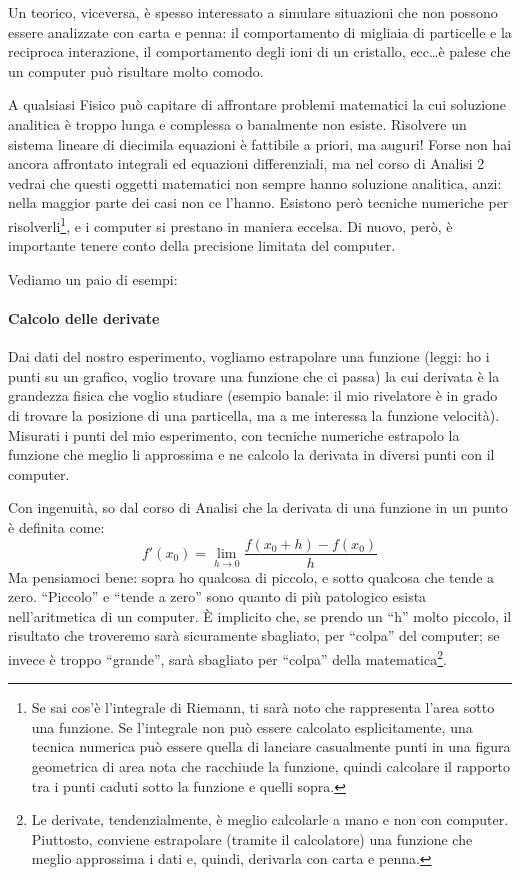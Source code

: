 	Un teorico, viceversa, è spesso interessato a simulare situazioni che non possono essere analizzate con carta e penna: il comportamento di migliaia di particelle e la reciproca interazione, il comportamento degli ioni di un cristallo, ecc\ldots è palese che un computer può risultare molto comodo. 
	
	A qualsiasi Fisico può capitare di affrontare problemi matematici la cui soluzione analitica è troppo lunga e complessa o banalmente non esiste. Risolvere un sistema lineare di diecimila equazioni è fattibile a priori, ma auguri! Forse non hai ancora affrontato integrali ed equazioni differenziali, ma nel corso di Analisi 2 vedrai che questi oggetti matematici non sempre hanno soluzione analitica, anzi: nella maggior parte dei casi non ce l'hanno. Esistono però tecniche numeriche per risolverli\footnote{Se sai cos'è l'integrale di Riemann, ti sarà noto che rappresenta l'area sotto una funzione. Se l'integrale non può essere calcolato esplicitamente, una tecnica numerica può essere quella di lanciare casualmente punti in una figura geometrica di area nota che racchiude la funzione, quindi calcolare il rapporto tra i punti caduti sotto la funzione e quelli sopra.}, e i computer si prestano in maniera eccelsa. Di nuovo, però, è importante tenere conto della precisione limitata del computer.
	
	Vediamo un paio di esempi:
	
	\paragraph{Calcolo delle derivate}
	Dai dati del nostro esperimento, vogliamo estrapolare una funzione (leggi: ho i punti su un grafico, voglio trovare una funzione che ci passa) la cui derivata è la grandezza fisica che voglio studiare (esempio banale: il mio rivelatore è in grado di trovare la posizione di una particella, ma a me interessa la funzione velocità). Misurati i punti del mio esperimento, con tecniche numeriche estrapolo la funzione che meglio li approssima e ne calcolo la derivata in diversi punti con il computer. 
	
	Con ingenuità, so dal corso di Analisi che la derivata di una funzione in un punto è definita come:  $$f'(x_{0})= \lim\limits_{h\to0}\frac{f(x_{0}+h)-f(x_{0})}{h}$$
	Ma pensiamoci bene: sopra ho qualcosa di piccolo, e sotto qualcosa che tende a zero. ``Piccolo'' e ``tende a zero'' sono quanto di più patologico esista nell'aritmetica di un computer. È implicito che, se prendo un ``h'' molto piccolo, il risultato che troveremo sarà sicuramente sbagliato, per ``colpa'' del computer; se invece è troppo ``grande'', sarà sbagliato per ``colpa'' della matematica\footnote{Le derivate, tendenzialmente, è meglio calcolarle a mano e non con computer. Piuttosto, conviene estrapolare (tramite il calcolatore) una funzione che meglio approssima i dati e, quindi, derivarla con carta e penna.}.
	
